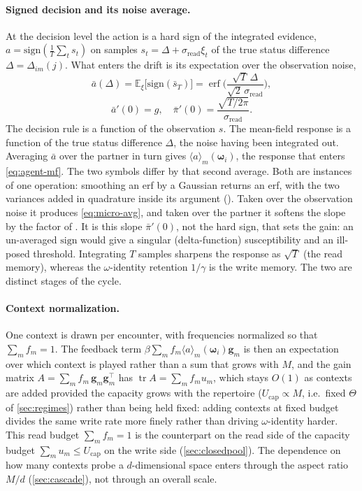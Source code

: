 \documentclass[
  aps,prx,
  reprint,
  superscriptaddress,
  nofootinbib,
  longbibliography
]{revtex4-2}
\newcommand{\w}{\bm{\omega}}
\newcommand{\g}{\mathbf{g}}
\newcommand{\sread}{\sigma_{\mathrm{read}}}
\newcommand{\sign}{\mathrm{sign}}
\newcommand{\pibar}{\bar\pi}
\newcommand{\gain}{g}
\newcommand{\smref}[1]{\cite[Sec.~#1]{SM}}
\newcommand{\smeq}[1]{\cite[Eq.~(#1)]{SM}}
\begin{document}
\paragraph{Signed decision and its noise average.} At the decision level the action is a hard sign of the integrated evidence, $a=\sign(\tfrac1T\sum_{t}s_t)$ on samples $s_t=\Delta+\sread\xi_t$ of the true status difference $\Delta=\Delta_{im}(j)$. What enters the drift is its expectation over the observation noise,
\begin{equation}\label{eq:micro-avg}
\bar a(\Delta)=\mathbb E_\xi\big[\sign(\bar s_T)\big]=\operatorname{erf}\!\Big(\frac{\sqrt T\,\Delta}{\sqrt2\,\sread}\Big),
\end{equation}
\begin{equation}
\bar a'(0)=\gain,\quad \pibar'(0)=\frac{\sqrt{T/2\pi}}{\sread}.
\end{equation}
The decision rule is a function of the observation $s$. The mean-field response is a function of the true status difference $\Delta$, the noise having been integrated out. Averaging $\bar a$ over the partner in turn gives $\langle a\rangle_m(\w_i)$, the response that enters \cref{eq:agent-mf}. The two symbols differ by that second average. Both are instances of one operation: smoothing an erf by a Gaussian returns an erf, with the two variances added in quadrature inside its argument (\smeq{S29}). Taken over the observation noise it produces \cref{eq:micro-avg}, and taken over the partner it softens the slope by the factor of \smref{S6}. It is this slope $\pibar'(0)$, not the hard sign, that sets the gain: an un-averaged $\sign$ would give a singular (delta-function) susceptibility and an ill-posed threshold. Integrating $T$ samples sharpens the response as $\sqrt T$ (the read memory), whereas the $\omega$-identity retention $1/\gamma$ is the write memory. The two are distinct stages of the cycle.

\paragraph{Context normalization.} One context is drawn per encounter, with frequencies normalized so that $\sum_m f_m=1$. The feedback term $\beta\sum_m f_m\langle a\rangle_m(\w_i)\g_m$ is then an expectation over which context is played rather than a sum that grows with $M$, and the gain matrix $A=\sum_m f_m\,\g_m\g_m^{\!\top}$ has $\operatorname{tr}A=\sum_m f_m u_m$, which stays $O(1)$ as contexts are added provided the capacity grows with the repertoire ($U_{\mathrm{cap}}\propto M$, i.e.\ fixed $\Theta$ of \cref{sec:regimes}) rather than being held fixed: adding contexts at fixed budget divides the same write rate more finely rather than driving $\omega$-identity harder. This read budget $\sum_m f_m=1$ is the counterpart on the read side of the capacity budget $\sum_m u_m\le U_{\mathrm{cap}}$ on the write side (\cref{sec:closedpool}). The dependence on how many contexts probe a $d$-dimensional space enters through the aspect ratio $M/d$ (\cref{sec:cascade}), not through an overall scale.
\end{document}
